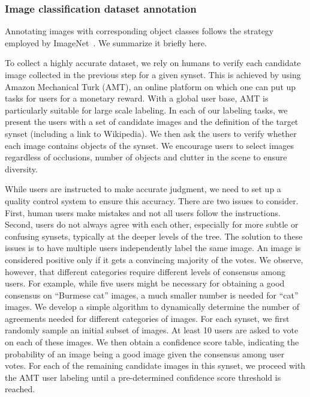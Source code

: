 \subsubsection{Image classification dataset annotation}
\label{sec:AnnotClsAnnot}

Annotating images with corresponding object classes follows the strategy employed by ImageNet~\citep{ImageNet}. We summarize it briefly here.

To collect a highly accurate dataset, we rely on humans to verify each candidate image collected in the previous step for a given synset. This is achieved by using Amazon Mechanical Turk (AMT), an online platform on which one can put up tasks for users for a monetary reward. With a global user base, AMT is particularly suitable for large scale labeling.
In each of our labeling tasks, we present the users with a set of candidate images and the definition of the target synset (including a link to Wikipedia). We then ask the users to verify whether each image contains objects of the synset. We encourage users to select images regardless of occlusions, number of objects and clutter in the scene to ensure diversity.

While users are instructed to make accurate judgment, we need to set up a quality control system to ensure this accuracy. There are two issues to consider. First, human users make mistakes and not all users follow the instructions. Second, users do not always agree with each other, especially for more subtle or confusing synsets, typically at the deeper levels of the tree. The solution to these issues is to have multiple users independently label the same image. An image is considered positive only if it gets a convincing majority of the votes. We observe, however, that different categories require different levels of consensus among users. For example, while five users might be necessary for obtaining a good consensus on “Burmese cat” images, a much smaller number is needed for “cat” images. We develop a simple algorithm to dynamically determine the number of agreements needed for different categories of images. For each synset, we first randomly sample an initial subset of images. At least 10 users are asked to vote on each of these images. We then obtain a confidence score table, indicating the probability of an image being a good image given the consensus among user votes. For each of the remaining candidate images in this synset, we proceed with the AMT user labeling until a pre-determined confidence score threshold is reached.

